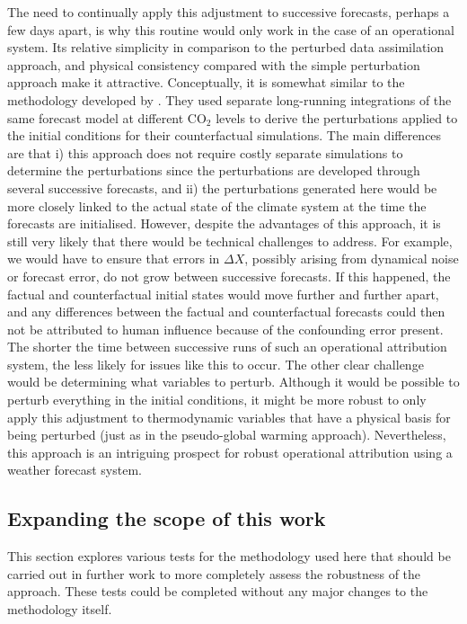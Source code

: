       The need to continually apply this adjustment to successive forecasts, perhaps a few days apart, is why this routine would only work in the case of an operational system. Its relative simplicity in comparison to the perturbed data assimilation approach, and physical consistency compared with the simple perturbation approach make it attractive. Conceptually, it is somewhat similar to the methodology developed by \citet{wang_initialized_2021}. They used separate long-running integrations of the same forecast model at different CO$_2$ levels to derive the perturbations applied to the initial conditions for their counterfactual simulations. The main differences are that i) this approach does not require costly separate simulations to determine the perturbations since the perturbations are developed through several successive forecasts, and ii) the perturbations generated here would be more closely linked to the actual state of the climate system at the time the forecasts are initialised. However, despite the advantages of this approach, it is still very likely that there would be technical challenges to address. For example, we would have to ensure that errors in $\Delta X$, possibly arising from dynamical noise or forecast error, do not grow between successive forecasts. If this happened, the factual and counterfactual initial states would move further and further apart, and any differences between the factual and counterfactual forecasts could then not be attributed to human influence because of the confounding error present. The shorter the time between successive runs of such an operational attribution system, the less likely for issues like this to occur. The other clear challenge would be determining what variables to perturb. Although it would be possible to perturb everything in the initial conditions, it might be more robust to only apply this adjustment to thermodynamic variables that have a physical basis for being perturbed (just as in the pseudo-global warming approach). Nevertheless, this approach is an intriguing prospect for robust operational attribution using a weather forecast system. 

  \subsection{Expanding the scope of this work}

    This section explores various tests for the methodology used here that should be carried out in further work to more completely assess the robustness of the approach. These tests could be completed without any major changes to the methodology itself.


